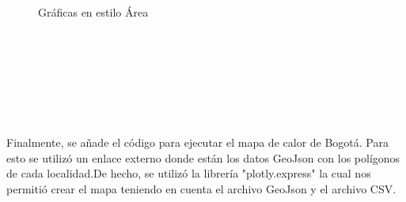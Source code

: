 \documentclass[conference,compsoc,onecolumn]{IEEEtran}
\begin{document}
\begin{figure}[htbp]
\centering
{}
\caption{ Gráficas en estilo Área} \label{fig:lego}
\end{figure}
\\\
\\\
\\\
\\\
\\\

Finalmente, se añade el código para ejecutar el mapa de calor de Bogotá. Para esto se utilizó un enlace externo donde están los datos GeoJson con los polígonos de cada localidad.De hecho, se utilizó la librería  "plotly.express" la cual nos permitió crear el mapa teniendo en cuenta el archivo GeoJson y el archivo CSV.
\\\
\end{document}
